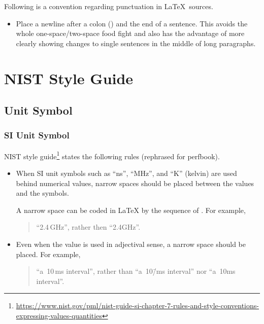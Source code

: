 Following is a convention regarding punctuation in \LaTeX\ sources.

\begin{itemize}
\item Place a newline after a colon (\co{:}) and the end of a sentence.
  This avoids the whole one-space/two-space food fight and also has
  the advantage of more clearly showing changes to single sentences
  in the middle of long paragraphs.
\end{itemize}

\section{NIST Style Guide}
\label{sec:app:styleguide:NIST Style Guide}

\subsection{Unit Symbol}
\label{sec:app:styleguide:Unit Symbol}

\subsubsection{SI Unit Symbol}
\label{sec:app:styleguide:SI Unit Symbol}

NIST style guide\footnote{
  \url{https://www.nist.gov/pml/nist-guide-si-chapter-7-rules-and-style-conventions-expressing-values-quantities}}
states the following rules (rephrased for perfbook).

\begin{itemize}
\item When SI unit symbols such as ``ns'', ``MHz'', and ``K'' (kelvin)
are used behind numerical values, narrow spaces should be placed between
the values and the symbols.

A narrow space can be coded in \LaTeX{} by the sequence of
\qco{\\,}.
For example,
\begin{quote}
  ``2.4\,GHz'', rather then ``2.4GHz''.
\end{quote}

\item Even when the value is used in adjectival sense, a narrow space
should be placed. For example,
\begin{quote}
  ``a~10\,ms interval'', rather than ``a~10\=/ms interval'' nor
  ``a~10ms interval''.
\end{quote}
\end{itemize}

